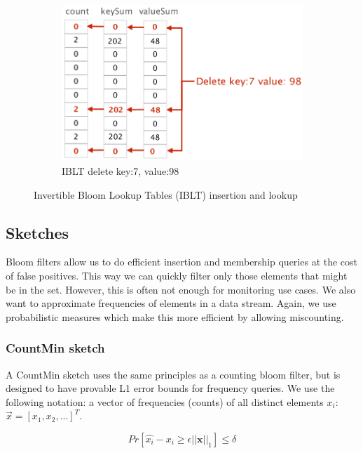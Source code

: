 \documentclass[11pt,oneside,a4paper]{article}
\begin{document}
\begin{figure}[hb]
	\begin{subfigure}[t]{.33\textwidth}
		\centering
		\includegraphics[width=1.25\textwidth,scale=1]{figures/iblt_3}
		\caption{IBLT delete key:7,  value:98}
		\label{fig:iblt_delete}
	\end{subfigure}
	\caption{Invertible Bloom Lookup Tables (IBLT) insertion and lookup \cite{advnet}}
\end{figure}

\newpage

\subsection{Sketches}

Bloom filters allow us to do efficient insertion and membership queries at the cost of false positives. This way we can quickly filter only those elements that might be in the set. However, this is often not enough for monitoring use cases. We also want to approximate frequencies of elements in a data stream. Again, we use probabilistic measures which make this more efficient by allowing miscounting.

\subsubsection{CountMin sketch}

A CountMin sketch uses the same principles as a counting bloom filter, but is designed to have provable L1 error bounds for frequency queries. We use the following notation: a vector of frequencies (counts) of all distinct elements $x_i$: $\vec{x} = [x_1, x_2, ...]^T$.

$$Pr[\hat{x_i} - x_i \geq \epsilon ||\textbf{x}||_1] \leq \delta$$
\end{document}
